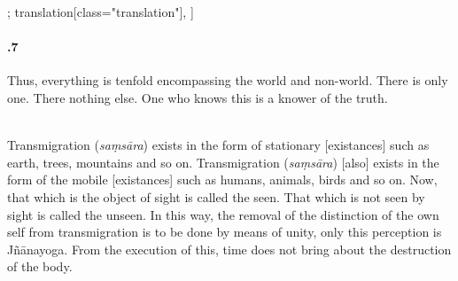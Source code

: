 \begin{alignment}[
  texts=edition[class="edition"];
  translation[class="translation"],
  ]
\begin{translation}
\begin{tlate}[21_7]
     \paragraph{.7} Thus, everything is tenfold encompassing the world and non-world. There is only one. There nothing else. One who knows this is a knower of the truth.
     \\\\
     \end{tlate}
\begin{tlate}[p21_02]
  Transmigration (\textit{saṃsāra}) exists in the form of stationary [existances] such as earth, trees, mountains and so on. Transmigration (\textit{saṃsāra}) [also] exists in the form of the mobile [existances] such as humans, animals, birds and so on. Now, that which is the object of sight is called the seen. That which is not seen by sight is called the unseen. In this way, the removal of the distinction of the own self from transmigration is to be done by means of unity, only this perception is Jñānayoga. From the execution of this, time does not bring about the destruction of the body.
 \flushpage
    \end{tlate}
  \end{translation}
\end{alignment}
\pagebreak %
